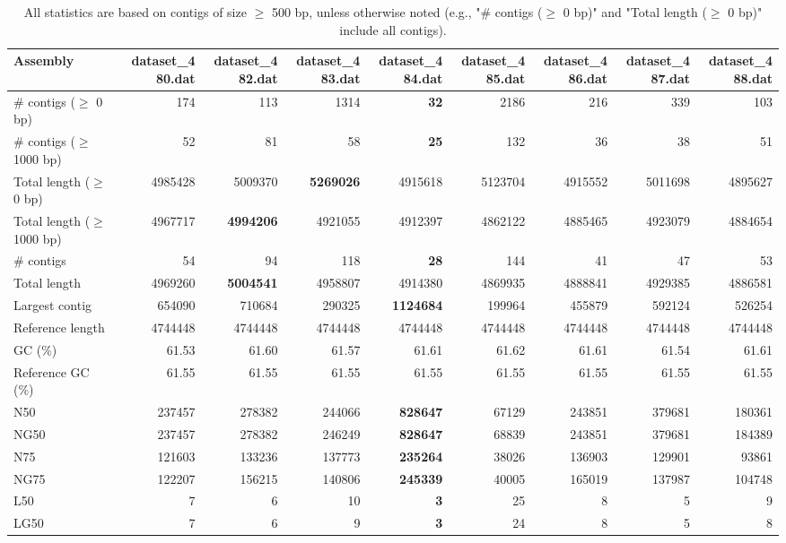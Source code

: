 \documentclass[12pt,a4paper]{article}
\begin{document}
\begin{table}[ht]
\begin{center}
\caption{All statistics are based on contigs of size $\geq$ 500 bp, unless otherwise noted (e.g., "\# contigs ($\geq$ 0 bp)" and "Total length ($\geq$ 0 bp)" include all contigs).}
\begin{tabular}{|l*{8}{|r}|}
\hline
Assembly & dataset\_480.dat & dataset\_482.dat & dataset\_483.dat & dataset\_484.dat & dataset\_485.dat & dataset\_486.dat & dataset\_487.dat & dataset\_488.dat \\ \hline
\# contigs ($\geq$ 0 bp) & 174 & 113 & 1314 & {\bf 32} & 2186 & 216 & 339 & 103 \\ \hline
\# contigs ($\geq$ 1000 bp) & 52 & 81 & 58 & {\bf 25} & 132 & 36 & 38 & 51 \\ \hline
Total length ($\geq$ 0 bp) & 4985428 & 5009370 & {\bf 5269026} & 4915618 & 5123704 & 4915552 & 5011698 & 4895627 \\ \hline
Total length ($\geq$ 1000 bp) & 4967717 & {\bf 4994206} & 4921055 & 4912397 & 4862122 & 4885465 & 4923079 & 4884654 \\ \hline
\# contigs & 54 & 94 & 118 & {\bf 28} & 144 & 41 & 47 & 53 \\ \hline
Total length & 4969260 & {\bf 5004541} & 4958807 & 4914380 & 4869935 & 4888841 & 4929385 & 4886581 \\ \hline
Largest contig & 654090 & 710684 & 290325 & {\bf 1124684} & 199964 & 455879 & 592124 & 526254 \\ \hline
Reference length & 4744448 & 4744448 & 4744448 & 4744448 & 4744448 & 4744448 & 4744448 & 4744448 \\ \hline
GC (\%) & 61.53 & 61.60 & 61.57 & 61.61 & 61.62 & 61.61 & 61.54 & 61.61 \\ \hline
Reference GC (\%) & 61.55 & 61.55 & 61.55 & 61.55 & 61.55 & 61.55 & 61.55 & 61.55 \\ \hline
N50 & 237457 & 278382 & 244066 & {\bf 828647} & 67129 & 243851 & 379681 & 180361 \\ \hline
NG50 & 237457 & 278382 & 246249 & {\bf 828647} & 68839 & 243851 & 379681 & 184389 \\ \hline
N75 & 121603 & 133236 & 137773 & {\bf 235264} & 38026 & 136903 & 129901 & 93861 \\ \hline
NG75 & 122207 & 156215 & 140806 & {\bf 245339} & 40005 & 165019 & 137987 & 104748 \\ \hline
L50 & 7 & 6 & 10 & {\bf 3} & 25 & 8 & 5 & 9 \\ \hline
LG50 & 7 & 6 & 9 & {\bf 3} & 24 & 8 & 5 & 8 \\ \hline

\end{tabular}
\end{center}
\end{table}
\end{document}
